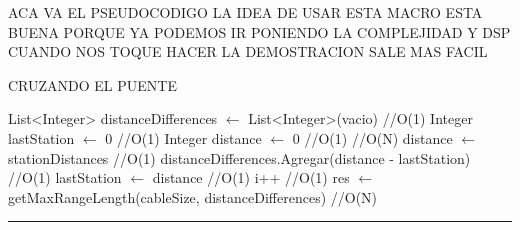 
ACA VA EL PSEUDOCODIGO
LA IDEA DE USAR ESTA MACRO ESTA BUENA PORQUE YA PODEMOS IR PONIENDO LA COMPLEJIDAD
Y DSP CUANDO NOS TOQUE HACER LA DEMOSTRACION SALE MAS FACIL

\begin{algorithm}[H]
\caption{CRUZANDO EL PUENTE}
\begin{algorithmic}[1]
\state List<Integer> distanceDifferences $\gets$ List<Integer>(vacio) \hfill //O(1)
\state Integer lastStation $\gets$ 0 \hfill //O(1)
\state Integer distance $\gets$ 0 \hfill //O(1)
 \hfill //O(N)
\state distance $\gets$ stationDistances \hfill //O(1)
\state distanceDifferences.Agregar(distance - lastStation) \hfill //O(1)
\state lastStation $\gets$ distance \hfill //O(1)
\state i++ \hfill //O(1)
\endwhile
\state res $\gets$ getMaxRangeLength(cableSize, distanceDifferences) \hfill //O(N)
\EndFunction 
\end{algorithmic}
\hrule
{}
\end{algorithm}

